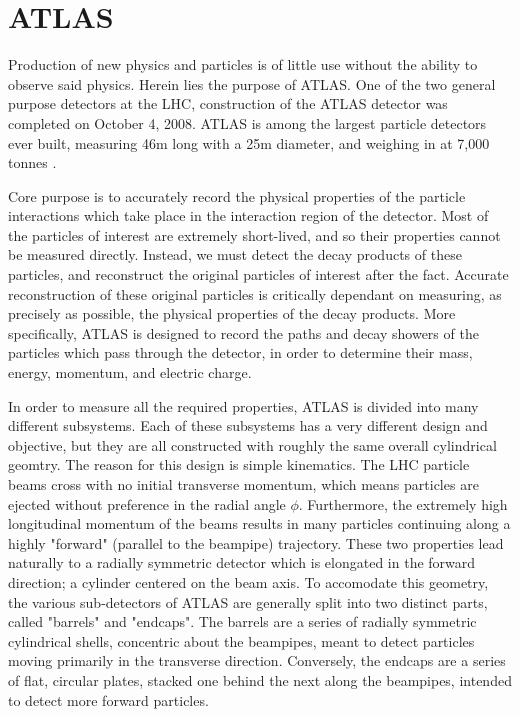 \chapter{ATLAS}
    Production of new physics and particles is of little use without the ability to observe said physics.
    Herein lies the purpose of ATLAS.
    One of the two general purpose detectors at the LHC, construction of the ATLAS detector was completed on October 4, 2008.
    ATLAS is among the largest particle detectors ever built, measuring 46m long with a 25m diameter, and weighing in at 7,000 tonnes \cite{atlas_website}.

    Core purpose is to accurately record the physical properties of the particle interactions which take place in the interaction region of the detector.
    Most of the particles of interest are extremely short-lived, and so their properties cannot be measured directly.
    Instead, we must detect the decay products of these particles, and reconstruct the original particles of interest after the fact.
    Accurate reconstruction of these original particles is critically dependant on measuring, as precisely as possible, the physical properties of the decay products.
    More specifically, ATLAS is designed to record the paths and decay showers of the particles which pass through the detector, in order to determine their mass, energy, momentum, and electric charge.

    In order to measure all the required properties, ATLAS is divided into many different subsystems.
    Each of these subsystems has a very different design and objective, but they are all constructed with roughly the same overall cylindrical geomtry.
    The reason for this design is simple kinematics.
    The LHC particle beams cross with no initial transverse momentum, which means particles are ejected without preference in the radial angle $\phi$.
    Furthermore, the extremely high longitudinal momentum of the beams results in many particles continuing along a highly "forward" (parallel to the beampipe) trajectory.
    These two properties lead naturally to a radially symmetric detector which is elongated in the forward direction; a cylinder centered on the beam axis.
    To accomodate this geometry, the various sub-detectors of ATLAS are generally split into two distinct parts, called "barrels" and "endcaps".
    The barrels are a series of radially symmetric cylindrical shells, concentric about the beampipes, meant to detect particles moving primarily in the transverse direction.
    Conversely, the endcaps are a series of flat, circular plates, stacked one behind the next along the beampipes, intended to detect more forward particles.

